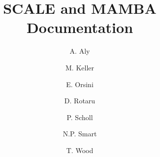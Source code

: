 \documentclass{article}
\begin{document}
\newcommand{\mainsection}[1]{\newpage \section{#1}}
\newcommand{\msubsection}[1]{\newpage \subsection{#1}}
\newcommand{\msubsubsection}[1]{\subsubsection{#1}}

\title{SCALE and MAMBA Documentation}
\author{
A. Aly
\and M. Keller 
\and E. Orsini
\and D. Rotaru 
\and P. Scholl 
\and N.P. Smart
\and T. Wood}

\maketitle

\tableofcontents























\end{document}
